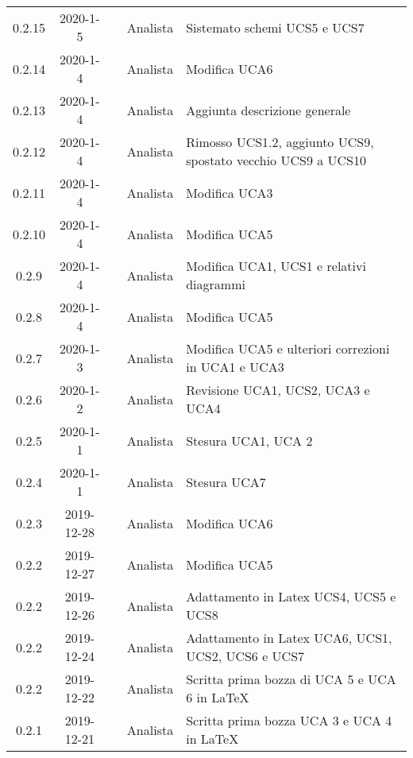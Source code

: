 {\begin{longtable}{ c c  C{4cm}  C{3cm} C{4cm}}
0.2.15 & 2020-1-5 & \PF{} & Analista & Sistemato schemi UCS5 e UCS7 \\

0.2.14 & 2020-1-4 & \PF{} & Analista & Modifica UCA6 \\

0.2.13 & 2020-1-4 & \CE{} & Analista & Aggiunta descrizione generale \\

0.2.12 & 2020-1-4 & \CE{} & Analista & Rimosso UCS1.2, aggiunto UCS9, spostato vecchio UCS9 a UCS10 \\

0.2.11 & 2020-1-4 & \PF{} & Analista & Modifica UCA3 \\

0.2.10 & 2020-1-4 & \DF{} & Analista & Modifica UCA5 \\

0.2.9 & 2020-1-4 & \DF{} & Analista & Modifica UCA1, UCS1 e relativi diagrammi \\

0.2.8 & 2020-1-4 & \CE{} & Analista & Modifica UCA5 \\

0.2.7 & 2020-1-3 & \CE{} & Analista & Modifica UCA5 e ulteriori correzioni in UCA1 e UCA3 \\

0.2.6 & 2020-1-2 & \CE{} & Analista & Revisione UCA1, UCS2, UCA3 e UCA4 \\

0.2.5 & 2020-1-1 & \BR{} & Analista & Stesura UCA1, UCA 2 \\

0.2.4 & 2020-1-1 & \PF{} & Analista & Stesura UCA7 \\

0.2.3 & 2019-12-28 & \DF{} & Analista & Modifica UCA6 \\

0.2.2 & 2019-12-27 & \PF{} & Analista & Modifica UCA5 \\

0.2.2 & 2019-12-26 & \CE{} & Analista & Adattamento in Latex UCS4, UCS5 e UCS8 \\

0.2.2 & 2019-12-24 & \DF{} & Analista & Adattamento in Latex UCA6, UCS1, UCS2, UCS6 e UCS7 \\

0.2.2 & 2019-12-22 & \PF{} & Analista & Scritta prima bozza di UCA 5 e UCA 6 in LaTeX\\

0.2.1 & 2019-12-21 & \PF{} & Analista & Scritta prima bozza UCA 3 e UCA 4 in LaTeX\\


\end{longtable}}
